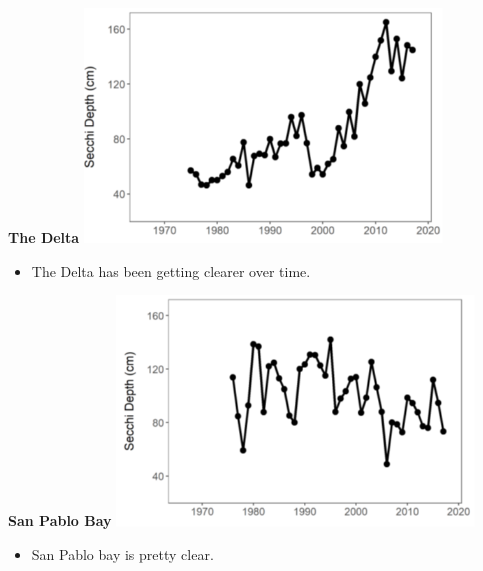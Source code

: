 \documentclass[]{article}\usepackage[]{graphicx}\usepackage[]{color}
\begin{document}
\vspace{1cm}

\begin{Row}
  \begin{Cell}{7}
    \begin{center}
      {\bf {\large The Delta}}
      \includegraphics[width=9.5cm,align=m]{figures/secchi/secchi_delta_tmp.png}
      \vspace{0.5cm}
      \begin{itemize}[leftmargin=2cm,rightmargin=0.5cm]
        \item The Delta has been getting clearer over time.
      \end{itemize}
    \end{center}
  \end{Cell}
  \begin{Cell}{6}
    \begin{center}
      {\bf {\large San Pablo Bay}}
      \includegraphics[width=9.5cm,align=m]{figures/secchi/secchi_san_pablo_bay_tmp.png}
      \vspace{0.5cm}
      \begin{itemize}[leftmargin=2cm,rightmargin=0.5cm]
        \item San Pablo bay is pretty clear.
      \end{itemize}
    \end{center}
  \end{Cell}
\end{Row}
\end{document}
